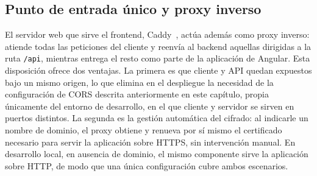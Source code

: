 \documentclass[12pt,a4paper,twoside,openright]{book}
\begin{document}
    \subsection{Punto de entrada único y proxy inverso}

    El servidor web que sirve el frontend, Caddy~\cite{caddy}, actúa además como proxy inverso:
    atiende todas las peticiones del cliente y reenvía al backend aquellas
    dirigidas a la ruta \texttt{/api}, mientras entrega el resto como parte de
    la aplicación de Angular. Esta disposición ofrece dos ventajas. La primera
    es que cliente y API quedan expuestos bajo un mismo origen, lo que elimina
    en el despliegue la necesidad de la configuración de CORS descrita anteriormente en este capítulo,
    propia únicamente del entorno de desarrollo, en el que cliente y servidor se sirven en puertos distintos. La
    segunda es la gestión automática del cifrado: al indicarle un nombre de
    dominio, el proxy obtiene y renueva por sí mismo el certificado necesario
    para servir la aplicación sobre HTTPS, sin intervención manual. En
    desarrollo local, en ausencia de dominio, el mismo componente sirve la
    aplicación sobre HTTP, de modo que una única configuración cubre ambos
    escenarios.
\end{document}
